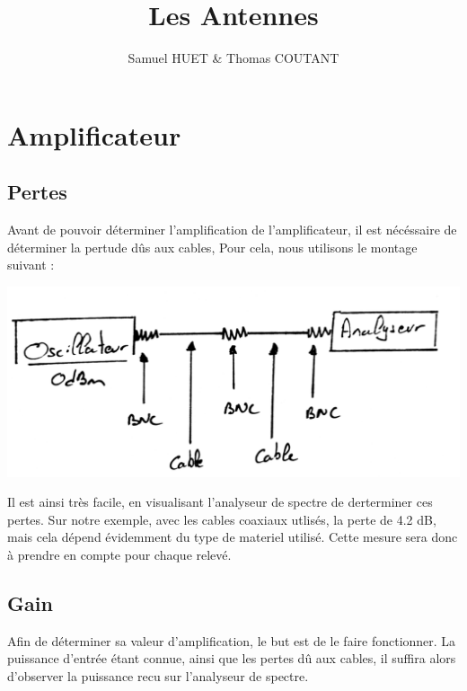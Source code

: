 \documentclass[a4paper,12pt]{report}            %
\author{Samuel HUET \& Thomas COUTANT}
\title{\huge{Les Antennes}}
\begin{document}
\maketitle
\renewcommand{\contentsname}{SOMMAIRE} %
\tableofcontents

\chapter{Amplificateur}

\section{Pertes}

Avant de pouvoir déterminer l'amplification de l'amplificateur, il est nécéssaire de déterminer la pertude dûs aux cables, 
Pour cela, nous utilisons le montage suivant :

\begin{center}\includegraphics[scale = 0.2]{pic/mesure_perte.png}\\ \end{center}

Il est ainsi très facile, en visualisant l'analyseur de spectre de derterminer ces pertes.
Sur notre exemple, avec les cables coaxiaux utlisés, la perte de 4.2 dB, mais cela dépend évidemment du type de
materiel utilisé. Cette mesure sera donc à prendre en compte pour chaque relevé.

\section{Gain}

Afin de déterminer sa valeur d'amplification, le but est de le faire fonctionner. La puissance d'entrée étant
connue, ainsi que les pertes dû aux cables, il suffira alors d'observer la puissance recu sur
l'analyseur de spectre.
\end{document}
